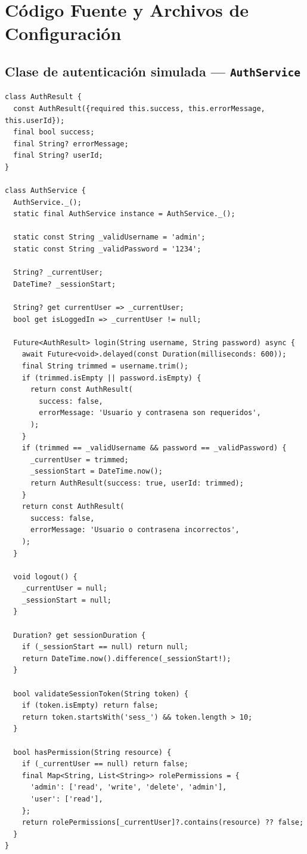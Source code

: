 \documentclass[12pt,a4paper]{article}
\begin{document}
\section{Código Fuente y Archivos de Configuración}

\subsection{Clase de autenticación simulada — \texttt{AuthService}}

\begin{lstlisting}[style=dart, caption={lib/auth\_service.dart}]
class AuthResult {
  const AuthResult({required this.success, this.errorMessage, this.userId});
  final bool success;
  final String? errorMessage;
  final String? userId;
}

class AuthService {
  AuthService._();
  static final AuthService instance = AuthService._();

  static const String _validUsername = 'admin';
  static const String _validPassword = '1234';

  String? _currentUser;
  DateTime? _sessionStart;

  String? get currentUser => _currentUser;
  bool get isLoggedIn => _currentUser != null;

  Future<AuthResult> login(String username, String password) async {
    await Future<void>.delayed(const Duration(milliseconds: 600));
    final String trimmed = username.trim();
    if (trimmed.isEmpty || password.isEmpty) {
      return const AuthResult(
        success: false,
        errorMessage: 'Usuario y contrasena son requeridos',
      );
    }
    if (trimmed == _validUsername && password == _validPassword) {
      _currentUser = trimmed;
      _sessionStart = DateTime.now();
      return AuthResult(success: true, userId: trimmed);
    }
    return const AuthResult(
      success: false,
      errorMessage: 'Usuario o contrasena incorrectos',
    );
  }

  void logout() {
    _currentUser = null;
    _sessionStart = null;
  }

  Duration? get sessionDuration {
    if (_sessionStart == null) return null;
    return DateTime.now().difference(_sessionStart!);
  }

  bool validateSessionToken(String token) {
    if (token.isEmpty) return false;
    return token.startsWith('sess_') && token.length > 10;
  }

  bool hasPermission(String resource) {
    if (_currentUser == null) return false;
    final Map<String, List<String>> rolePermissions = {
      'admin': ['read', 'write', 'delete', 'admin'],
      'user': ['read'],
    };
    return rolePermissions[_currentUser]?.contains(resource) ?? false;
  }
}
\end{lstlisting}
\end{document}
